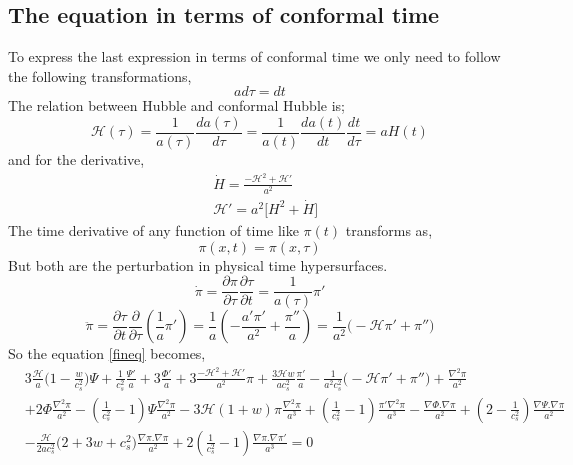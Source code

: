 \documentclass[a4paper,11pt]{article}
\def\be{\begin{equation}}
\def\ee{\end{equation}}
\begin{document}
  \subsection{The equation in terms of conformal time}
  To express the last expression in terms of conformal time we only need to follow the following transformations, \\
  \be
  a d \tau= dt
  \ee
  The relation between Hubble and conformal Hubble is;
\be
\mathcal{H} (\tau)=\frac{1}{a(\tau) }\frac{d a(\tau)}{d \tau }= \frac{1}{a(t) } \frac{d a (t) }{d t} \frac{d t }{ d\tau}= a H(t)
\ee
and for the derivative,
\begin{align}
& \dot{H}= \frac{-\mathcal{H}^2+ \mathcal{H}'}{a^2} \nonumber \\ &
\mathcal{H}'=a^2 \Big[ H^2 + \dot{H}\Big ]
\end{align}
The time derivative of any function of time like $\pi(t)$ transforms as,
\be
\pi(x,t)=\pi(x,\tau)
\ee
But both are the perturbation in physical time hypersurfaces.
\be
\dot{\pi}=\frac{\partial \pi}{\partial \tau}  \frac{\partial \tau}{\partial t} = \frac{1}{a(\tau)} \pi '
\ee
\be
\ddot{\pi}=\frac{\partial \tau}  {\partial t} \frac{\partial }{\partial \tau} (\frac{1}{a}\pi ' ) = \frac{1}{a} (-\frac{a ' \pi'}{a^2}+ \frac{\pi''}{a})= \frac{1}{a^2} \Big(- \mathcal{H} \pi' + \pi'' \Big)
\ee
So the equation \ref{fineq} becomes,
\begin{align} 
 & 3 \frac{\mathcal{H}
}{a} \Big( 1- \frac{w}{c_s^2} \Big )\Psi + \frac{ 1}{c_s^2} \frac{\Psi'}{a}+ 3 \frac{\Phi'}{a} + 3  \frac{-\mathcal{H}^2 + \mathcal{H}'}{a^2} \pi + \frac{3 \mathcal{H} w}{ a c_s^2} \frac{\pi'}{a}  -\frac{  1}{ a^2 c_s^2} \Big(- \mathcal{H} \pi' + \pi'' \Big) + \frac{\nabla^2 \pi }{a^2}
\nonumber \\ &
     +2   \Phi  \frac{\nabla^2 \pi }{a^2}   
  -   (\frac{1}{c_s^2}-1)  \Psi \frac{\nabla^2 \pi }{a^2}   
  - 3 \mathcal{H} (1+w)\pi \frac{\nabla^2 \pi }{a^3}  
        +   (\frac{1}{c_s^2}-1) \frac{ \pi' \nabla^2 {\pi }}{a^3}   
             - \frac{\nabla  \Phi . \nabla \pi }{a^2} 
        +(2-\frac{1}{c_s^2}) \frac{\nabla  \Psi . \nabla \pi }{a^2}   
    \nonumber \\ &
 -\frac{\mathcal{H}} {2 a c_s^2} \Big(2+3w+c_s^2  \Big)\frac{\nabla  \pi . \nabla \pi } {a^2}
    +2   (\frac{1}{c_s^2}-1)\frac{\nabla  \pi . \nabla {\pi'} } {a^3}       =0 \label{fineq}
  \end{align} 
\end{document}
